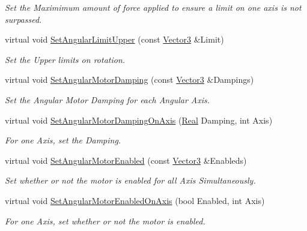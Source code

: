 \begin{DoxyCompactItemize}
\begin{DoxyCompactList}\small\item\em Set the Maximimum amount of force applied to ensure a limit on one axis is not surpassed. \item\end{DoxyCompactList}\item 
virtual void \hyperlink{classphys_1_1Generic6DofConstraint_ad1995d5c76e54895a51ef26ab9b03e3c}{SetAngularLimitUpper} (const \hyperlink{classphys_1_1Vector3}{Vector3} \&Limit)
\begin{DoxyCompactList}\small\item\em Set the Upper limits on rotation. \item\end{DoxyCompactList}\item 
virtual void \hyperlink{classphys_1_1Generic6DofConstraint_aec7a765d3c4cc39c1463dcf4a76a1428}{SetAngularMotorDamping} (const \hyperlink{classphys_1_1Vector3}{Vector3} \&Dampings)
\begin{DoxyCompactList}\small\item\em Set the Angular Motor Damping for each Angular Axis. \item\end{DoxyCompactList}\item 
virtual void \hyperlink{classphys_1_1Generic6DofConstraint_aa0ee16bfe1d7b461481118caa935c41a}{SetAngularMotorDampingOnAxis} (\hyperlink{namespacephys_af7eb897198d265b8e868f45240230d5f}{Real} Damping, int Axis)
\begin{DoxyCompactList}\small\item\em For one Axis, set the Damping. \item\end{DoxyCompactList}\item 
virtual void \hyperlink{classphys_1_1Generic6DofConstraint_a25ee52759a22ccf7a5ed4a3bfdcd6186}{SetAngularMotorEnabled} (const \hyperlink{classphys_1_1Vector3}{Vector3} \&Enableds)
\begin{DoxyCompactList}\small\item\em Set whether or not the motor is enabled for all Axis Simultaneously. \item\end{DoxyCompactList}\item 
virtual void \hyperlink{classphys_1_1Generic6DofConstraint_a78b9af18d7ac31b822bf5911e47f8dc0}{SetAngularMotorEnabledOnAxis} (bool Enabled, int Axis)
\begin{DoxyCompactList}\small\item\em For one Axis, set whether or not the motor is enabled. \item\end{DoxyCompactList}\item 

\end{DoxyCompactItemize}
